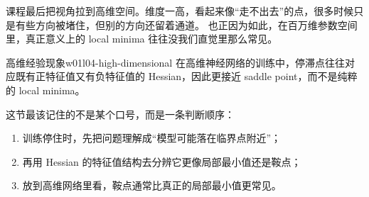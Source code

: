 \documentclass[main.tex]{subfiles}
\begin{document}
课程最后把视角拉到高维空间。维度一高，看起来像“走不出去”的点，很多时候只是有些方向被堵住，但别的方向还留着通道。
也正因为如此，在百万维参数空间里，真正意义上的 local minima 往往没我们直觉里那么常见。

\begin{fact}{高维经验现象}{w01l04-high-dimensional}
在高维神经网络的训练中，停滞点往往对应既有正特征值又有负特征值的 Hessian，因此更接近 saddle point，而不是纯粹的 local minima。
\end{fact}

\begin{summarybox}
这节最该记住的不是某个口号，而是一条判断顺序：
\begin{enumerate}
  \item 训练停住时，先把问题理解成“模型可能落在临界点附近”；
  \item 再用 Hessian 的特征值结构去分辨它更像局部最小值还是鞍点；
  \item 放到高维网络里看，鞍点通常比真正的局部最小值更常见。
\end{enumerate}
\end{summarybox}
\end{document}

